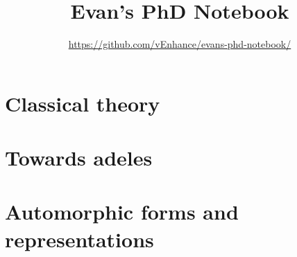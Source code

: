 \documentclass[11pt]{scrreprt}
\begin{document}
\title{Evan's PhD Notebook}
\subtitle{\url{https://github.com/vEnhance/evans-phd-notebook/}}
\maketitle
\tableofcontents



\part{Classical theory}




\part{Towards adeles}




\part{Automorphic forms and representations}


\end{document}
